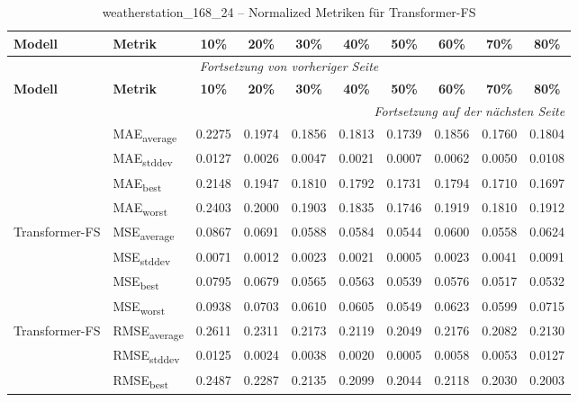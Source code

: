 {\small
\begin{longtable}{l l c c c c c c c c}
    \toprule
    \textbf{Modell} & \textbf{Metrik} & \textbf{10\%} & \textbf{20\%} & \textbf{30\%} & \textbf{40\%} & \textbf{50\%} & \textbf{60\%} & \textbf{70\%} & \textbf{80\%} \\
    \midrule
    \endfirsthead
    \multicolumn{10}{c}{\textit{Fortsetzung von vorheriger Seite}} \\
    \toprule
    \textbf{Modell} & \textbf{Metrik} & \textbf{10\%} & \textbf{20\%} & \textbf{30\%} & \textbf{40\%} & \textbf{50\%} & \textbf{60\%} & \textbf{70\%} & \textbf{80\%} \\
    \midrule
    \endhead
    \midrule
    \multicolumn{10}{r}{\textit{Fortsetzung auf der nächsten Seite}} \\
    \midrule
    \endfoot
    \bottomrule
    \caption{weatherstation_168_24 -- Normalized Metriken für Transformer-FS}
    \label{tab:weatherstation_168_24_normalized_transformer-fs}
    \endlastfoot
\multirow{4}{*}{Transformer-FS} & MAE\textsubscript{average} & 0.2275 & 0.1974 & 0.1856 & 0.1813 & 0.1739 & 0.1856 & 0.1760 & 0.1804 \\
 & MAE\textsubscript{stddev} & 0.0127 & 0.0026 & 0.0047 & 0.0021 & 0.0007 & 0.0062 & 0.0050 & 0.0108 \\
 & MAE\textsubscript{best} & 0.2148 & 0.1947 & 0.1810 & 0.1792 & 0.1731 & 0.1794 & 0.1710 & 0.1697 \\
 & MAE\textsubscript{worst} & 0.2403 & 0.2000 & 0.1903 & 0.1835 & 0.1746 & 0.1919 & 0.1810 & 0.1912 \\
\cmidrule(lr){2-10}
\multirow{4}{*}{Transformer-FS} & MSE\textsubscript{average} & 0.0867 & 0.0691 & 0.0588 & 0.0584 & 0.0544 & 0.0600 & 0.0558 & 0.0624 \\
 & MSE\textsubscript{stddev} & 0.0071 & 0.0012 & 0.0023 & 0.0021 & 0.0005 & 0.0023 & 0.0041 & 0.0091 \\
 & MSE\textsubscript{best} & 0.0795 & 0.0679 & 0.0565 & 0.0563 & 0.0539 & 0.0576 & 0.0517 & 0.0532 \\
 & MSE\textsubscript{worst} & 0.0938 & 0.0703 & 0.0610 & 0.0605 & 0.0549 & 0.0623 & 0.0599 & 0.0715 \\
\cmidrule(lr){2-10}
\multirow{4}{*}{Transformer-FS} & RMSE\textsubscript{average} & 0.2611 & 0.2311 & 0.2173 & 0.2119 & 0.2049 & 0.2176 & 0.2082 & 0.2130 \\
 & RMSE\textsubscript{stddev} & 0.0125 & 0.0024 & 0.0038 & 0.0020 & 0.0005 & 0.0058 & 0.0053 & 0.0127 \\
 & RMSE\textsubscript{best} & 0.2487 & 0.2287 & 0.2135 & 0.2099 & 0.2044 & 0.2118 & 0.2030 & 0.2003 \\

\end{longtable}}

